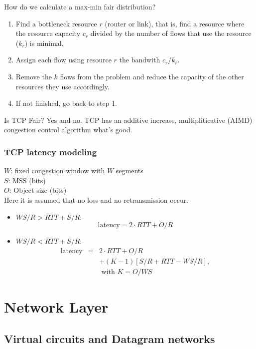 \documentclass[10pt, a4paper, twocolumn]{scrartcl}
\begin{document}
How do we calculate a max-min fair distribution?
\begin{enumerate}
	\item Find a bottleneck resource $r$ (router or link), that is, find a resource where the resource capacity $c_r$ divided by the number of flows that use the resource ($k_r$) is minimal.
	\item Assign each flow using resource $r$ the bandwith $c_r/k_r$.
	\item Remove the $k$ flows from the problem and reduce the capacity of the other resources they use accordingly.
	\item If not finished, go back to step 1.
\end{enumerate}

Is TCP Fair? Yes and no. TCP has an additive increase, multipliticative (AIMD) congestion control algorithm what's good.

\subsubsection{TCP latency modeling}

$W$: fixed congestion window with $W$ segments\\
$S$: MSS (bits)\\
$O$: Object size (bits)\\

Here it is assumed that no loss and no retransmission occur.

\begin{itemize}
	\item $WS/R > RTT + S/R$:
		\begin{displaymath}
			\mbox{latency} = 2\cdotp RTT + O/R
		\end{displaymath}
	\item $WS/R < RTT + S/R$:
		\begin{eqnarray}
			\mbox{latency} &	= &	2\cdotp RTT + O/R \nonumber\\
			&			&	+ (K-1)[S/R + RTT - WS/R], \nonumber \\
			&			&	\mbox{ with } K= O/WS \nonumber
		\end{eqnarray}
\end{itemize}

\section{Network Layer}

\subsection{Virtual circuits and Datagram networks}
\end{document}
